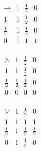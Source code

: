 \begin{definicao}
            \noindent
            \begin{minipage}{0.3\textwidth}
                \[
                    \begin{array}{c|ccc}
                        \to & 1 & \frac{1}{2} & 0 \\
                        \hline
                        1           & 1 & \frac{1}{2} & 0 \\
                        \frac{1}{2} & 1 & \frac{1}{2} & 0 \\
                        0           & 1 & 1           & 1 \\
                    \end{array}
                \]
            \end{minipage}
            \begin{minipage}{0.3\textwidth}
                \[
                    \begin{array}{c|ccc}
                        \land       & 1           & \frac{1}{2} & 0 \\
                        \hline
                        1           & 1           & \frac{1}{2} & 0 \\
                        \frac{1}{2} & \frac{1}{2} & \frac{1}{2} & 0 \\
                        0           & 0           & 0           & 0 \\
                    \end{array}
                \]
            \end{minipage}
            \begin{minipage}{0.3\textwidth}
                \[
                    \begin{array}{c|ccc}
                        \lor        & 1 & \frac{1}{2} & 0           \\
                        \hline
                        1           & 1 & 1           & 1           \\
                        \frac{1}{2} & 1 & \frac{1}{2} & \frac{1}{2} \\
                        0           & 1 & \frac{1}{2} & 0           \\
                    \end{array}
                \]
            \end{minipage}

            \vspace{0.5cm}


\end{definicao}
